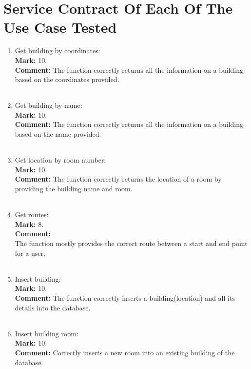 \documentclass[12pt]{article}
\begin{document}
	\section{Service Contract Of Each Of The Use Case Tested}
	\begin{enumerate}
    \item Get building by coordinates:\\
    \textbf{Mark: }
    10.\\
    \textbf{Comment:}
    The function correctly returns all the information on a building based on the coordinates provided.\\ \\
    
    \item Get building by name:\\
    \textbf{Mark: }
    10.\\
    \textbf{Comment:}
    The function correctly returns all the information on a building based on the name provided.\\ \\
    
    \item Get location by room number:\\
    \textbf{Mark: }
    10.\\
    \textbf{Comment:}
    The function correctly returns the location of a room by providing the building name and room.\\ \\
    
    \item Get routes:\\
    \textbf{Mark: }
    8.\\
    \textbf{Comment:}\\
    The function mostly provides the correct route between a start and end point for a user.\\ \\
    
    \item Insert building:\\
    \textbf{Mark: }
    10.\\
    \textbf{Comment:}
    The function correctly inserts a building(location) and all its details into the database.\\ \\
    
    \item Insert building room:\\
    \textbf{Mark: }
    10.\\
    \textbf{Comment:}
    Correctly inserts a new room into an existing building of the database.\\ \\
    

\end{enumerate}
\end{document}
